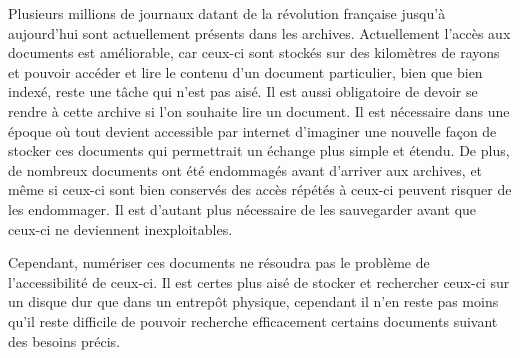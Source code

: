     Plusieurs millions de journaux datant de la révolution française jusqu’à aujourd’hui sont actuellement présents dans les archives. Actuellement l’accès aux documents est améliorable, car ceux-ci sont stockés sur des kilomètres de rayons et pouvoir accéder et lire le contenu d’un document particulier, bien que bien indexé, reste une tâche qui n’est pas aisé. Il est aussi obligatoire de devoir se rendre à cette archive si l’on souhaite lire un document. Il est nécessaire dans une époque où tout devient accessible par internet d’imaginer une nouvelle façon de stocker ces documents qui permettrait un échange plus simple et étendu. De plus, de nombreux documents ont été endommagés avant d’arriver aux archives, et même si ceux-ci sont bien conservés des accès répétés à ceux-ci peuvent risquer de les endommager. Il est d’autant plus nécessaire de les sauvegarder avant que ceux-ci ne deviennent inexploitables.

    Cependant, numériser ces documents ne résoudra pas le problème de l’accessibilité de ceux-ci. Il est certes plus aisé de stocker et rechercher ceux-ci sur un disque dur que dans un entrepôt physique, cependant il n’en reste pas moins qu’il reste difficile de pouvoir recherche efficacement certains documents suivant des besoins précis.


